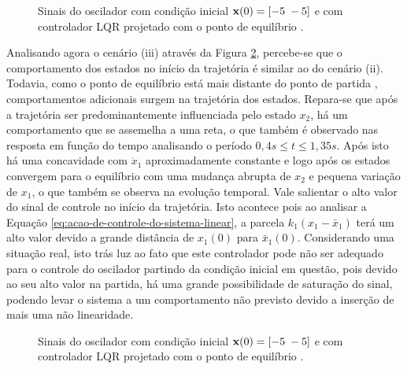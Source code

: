 \begin{figure}[H]
    \caption{Sinais do oscilador com condição inicial $\ssvec{x}(0) = [-5
    \thickspace -5]$ e com controlador LQR projetado com o ponto de equilíbrio \peqone.}
    \vspace{-10pt}
    \hspace{-30pt}
    \label{fig:sinais-do-scilador-com-controle-e-peq1}
    \begin{minipage}{\linewidth}
        
    \end{minipage}
    \vspace{-10pt}
\end{figure}

Analisando agora o cenário (iii) através da Figura
\ref{fig:sinais-do-scilador-com-controle-e-peq2}, percebe-se que o comportamento
dos estados no início da trajetória é similar ao do cenário (ii). Todavia, como
o ponto de equilíbrio \peqtwo está mais distante do ponto de partida \inicond,
comportamentos adicionais surgem na trajetória dos estados. Repara-se que após a
trajetória ser predominantemente influenciada pelo estado $x_2$, há um
comportamento que se assemelha a uma reta, o que também é observado nas resposta
em função do tempo analisando o período $0,4s \leq t \leq 1,35s$. Após isto há
uma concavidade com $\dot{x}_1$ aproximadamente constante e logo após os
estados convergem para o equilíbrio \peqtwo com uma mudança abrupta de $x_2$
e pequena variação de $x_1$, o que também se observa na evolução temporal.
Vale salientar o alto valor do sinal de controle no início da trajetória. Isto
acontece pois ao analisar a Equação \ref{eq:acao-de-controle-do-sistema-linear},
a parcela $k_1(x_1 - \bar{x}_1)$ terá um alto valor devido a grande distância de
$x_1(0)$ para $\bar{x}_1(0)$. Considerando uma situação real, isto trás luz ao
fato que este controlador pode não ser adequado para o controle do oscilador
partindo da condição inicial em questão, pois devido ao seu alto valor na
partida, há uma grande possibilidade de saturação do sinal, podendo levar o
sistema a um comportamento não previsto devido a inserção de mais uma não
linearidade.

\begin{figure}[H]
    \caption{Sinais do oscilador com condição inicial $\ssvec{x}(0) = [-5
    \thickspace -5]$ e com controlador LQR projetado com o ponto de equilíbrio \peqtwo.}
    \vspace{-10pt}
    \hspace{-30pt}
    \label{fig:sinais-do-scilador-com-controle-e-peq2}
    \begin{minipage}{\linewidth}
        
    \end{minipage}
    \vspace{-10pt}
\end{figure}

